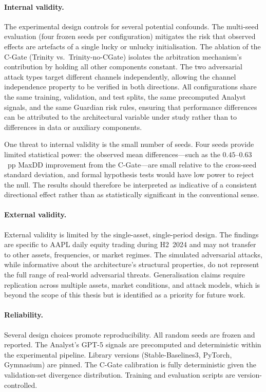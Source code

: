 \paragraph{Internal validity.}
The experimental design controls for several potential confounds. The
multi-seed evaluation (four frozen seeds per configuration) mitigates the
risk that observed effects are artefacts of a single lucky or unlucky
initialisation. The ablation of the C-Gate (Trinity vs.\ Trinity-no-CGate)
isolates the arbitration mechanism's contribution by holding all other
components constant. The two adversarial attack types target different
channels independently, allowing the channel independence property to be
verified in both directions. All configurations share the same training,
validation, and test splits, the same precomputed Analyst signals, and the
same Guardian risk rules, ensuring that performance differences can be
attributed to the architectural variable under study rather than to
differences in data or auxiliary components.

One threat to internal validity is the small number of seeds. Four seeds
provide limited statistical power: the observed mean differences---such as
the $0.45$--$0.63$~pp MaxDD improvement from the C-Gate---are small relative
to the cross-seed standard deviation, and formal hypothesis tests would have
low power to reject the null. The results should therefore be interpreted as
indicative of a consistent directional effect rather than as statistically
significant in the conventional sense.

\paragraph{External validity.}
External validity is limited by the single-asset, single-period design. The
findings are specific to AAPL daily equity trading during H2~2024 and may not
transfer to other assets, frequencies, or market regimes. The simulated
adversarial attacks, while informative about the architecture's structural
properties, do not represent the full range of real-world adversarial threats.
Generalisation claims require replication across multiple assets, market
conditions, and attack models, which is beyond the scope of this thesis but
is identified as a priority for future work.

\paragraph{Reliability.}
Several design choices promote reproducibility. All random seeds are frozen
and reported. The Analyst's GPT-5 signals are precomputed and deterministic
within the experimental pipeline. Library versions (Stable-Baselines3, PyTorch,
Gymnasium) are pinned. The C-Gate calibration is fully deterministic given the
validation-set divergence distribution. Training and evaluation scripts are
version-controlled.

